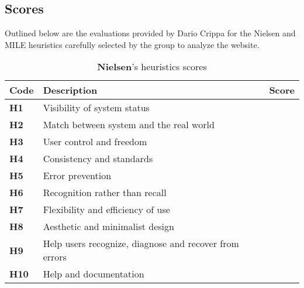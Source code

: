 \section*{\color{unicefBlue}{Dario's Evaluation}}
\subsection*{Scores}
Outlined below are the evaluations provided by Dario Crippa for the Nielsen and MILE heuristics carefully selected by the group to analyze the website.\\
\begin{table}[htp!]
    \centering
    \begin{tabular}{ |l|l|c| }
        \hline
        \textbf{Code} & \textbf{Description} & \textbf{Score}\\
        \hline
        \textbf{H1} & Visibility of system status & \textbf{\color{unicefOrange}{3}}\\
        \hline
        \textbf{H2} & Match between system and the real world & \textbf{\color{unicefGreen}{5}}\\
        \hline
        \textbf{H3} & User control and freedom & \textbf{\color{unicefRed}{2}}\\
        \hline
        \textbf{H4} & Consistency and standards & \textbf{\color{unicefGreen}{5}}\\
        \hline
        \textbf{H5} & Error prevention & \textbf{\color{unicefGreen}{4}}\\
        \hline
        \textbf{H6} & Recognition rather than recall & \textbf{\color{unicefGreen}{5}}\\
        \hline
        \textbf{H7} & Flexibility and efficiency of use & \textbf{\color{unicefOrange}{3}}\\
        \hline
        \textbf{H8} & Aesthetic and minimalist design & \textbf{\color{unicefOrange}{3}}\\
        \hline
        \textbf{H9} & Help users recognize, diagnose and recover from errors & \textbf{\color{unicefGray}{n.a}}\\
        \hline
        \textbf{H10} & Help and documentation & \textbf{\color{unicefGreen}{4}}\\
        \hline
    \end{tabular}
    \caption{\textbf{Nielsen}'s heuristics scores}
\end{table}
